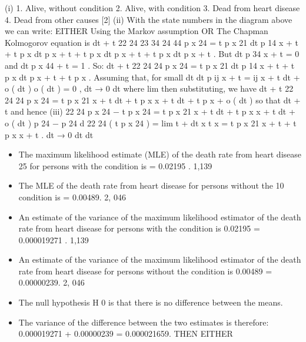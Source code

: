 \documentclass[a4paper,12pt]{article}
\begin{document}
\begin{enumerate}

(i)
1. Alive, without
condition 2. Alive, with
condition
3. Dead from heart
disease 4. Dead from other
causes
[2]
(ii)
With the state numbers in the diagram above we can write:
EITHER
Using the Markov assumption
OR
The Chapman Kolmogorov equation is
dt + t 22
24
23
34
24
44
p x 24 = t p x 21 dt p 14
x + t + t p x dt p x + t + t p x dt p x + t + t p x dt p x + t .
But dt
p 34
x + t = 0
and dt
p x 44 + t = 1 .
So:
dt + t
22
24
24
p x 24 = t p x 21 dt p 14
x + t + t p x dt p x + t + t p x .
Assuming that, for small dt
dt
p ij x + t = \mu ij x + t dt + o ( dt )
o ( dt )
= 0 ,
dt → 0 dt
where lim
then substituting, we have
dt + t
22 24
24
p x 24 = t p x 21 
x + t dt + t p x \mu x + t dt + t p x + o ( dt )
so that
dt + t
and hence
(iii)
22 24
p x 24 − t p x 24 = t p x 21 
x + t dt + t p x \mu x + t dt + o ( dt )
p 24 − p 24
d
22 24
( t p x 24 ) = lim t + dt x t x = t p x 21 
x + t + t p x \mu x + t .
dt → 0
dt
dt
\begin{itemize}
\item The maximum likelihood estimate (MLE) of the death rate from heart disease
25
for persons with the condition is
= 0.02195 .
1,139
\item The MLE of the death rate from heart disease for persons without the
10
condition is
= 0.00489.
2, 046

\item An estimate of the variance of the maximum likelihood estimator of the death
rate from heart disease for persons with the condition is
0.02195
= 0.000019271 .
1,139
\item An estimate of the variance of the maximum likelihood estimator of the death
rate from heart disease for persons without the condition is
0.00489
= 0.00000239.
2, 046
\item The null hypothesis H 0 is that there is no difference between the means.
\item The variance of the difference between the two estimates is therefore:
0.000019271 + 0.00000239 = 0.000021659.
THEN EITHER


\end{itemize}
\end{enumerate}
\end{document}
